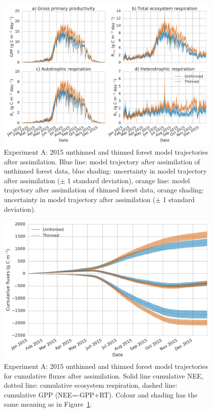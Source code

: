 \documentclass[draft,jgrga]{agutexSI}
\begin{document}
\begin{figure}
 \noindent\includegraphics[width=40pc]{flux_compa.pdf}
\caption{Experiment A: 2015 unthinned and thinned forest model trajectories after assimilation. Blue line: model trajectory after assimilation of unthinned forest data, blue shading: uncertainty in model trajectory after assimilation (\(\pm\) 1 standard deviation), orange line: model trajectory after assimilation of thinned forest data, orange shading: uncertainty in model trajectory after assimilation (\(\pm\) 1 standard deviation).}
 \label{fig:fluxcompa}
 \end{figure}
 
 \begin{figure}
 \noindent\includegraphics[width=40pc]{cum_fluxa.pdf}
\caption{Experiment A: 2015 unthinned and thinned forest model trajectories for cumulative fluxes after assimilation. Solid line cumulative NEE, dotted line: cumulative ecosystem respiration, dashed line: cumulative GPP (NEE=-GPP+RT). Colour and shading has the same meaning as in Figure~\ref{fig:fluxcompa}.}
 \label{fig:fluxcuma}
 \end{figure}
\end{document}
